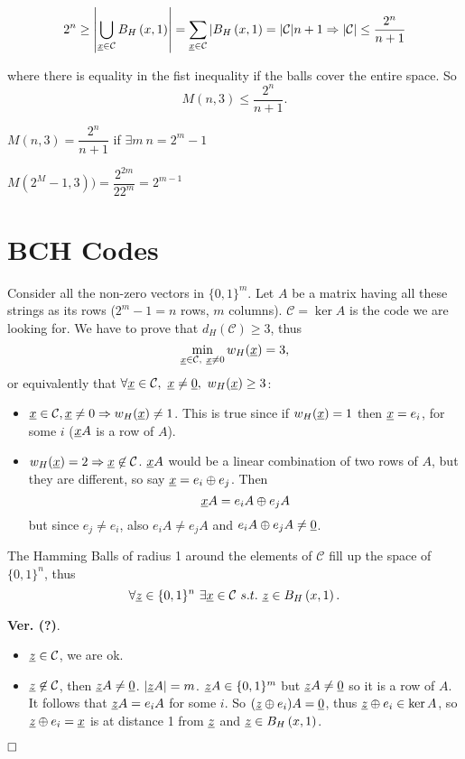 \[
2^n \geq \left|\bigcup_{\underline{x}\in \mathcal{C}}B_H\left(x, 1\right)\right| = \sum_{\underline{x} \in \mathcal{C}}|B_H\left(x, 1\right) = |\mathcal{C}|n + 1 \Rightarrow |\mathcal{C}| \leq \dfrac{2^n}{n+1}
\]

where there is equality in the fist inequality if the balls cover the entire space. So $$M(n, 3) \leq \dfrac{2^n}{n+1}.$$

\begin{thm}[Hamming]
	$M(n, 3) = \dfrac{2^n}{n+1}$ if $\exists m\ n = 2^m -1$	
\end{thm}

$M(2^M-1, 3) ) = \dfrac{2^{2m}}{22^m} = 2^{m-1}$

\section{BCH Codes}
Consider all the non-zero vectors in $\{0, 1\}^m$. Let $A$ be a matrix having all these strings as its rows ($2^m-1 = n$ rows, $m$ columns). $\mathcal{C} = \ker A$ is the code we are looking for. We have to prove that $d_H(\mathcal{C})\geq 3$, thus $$\min_{\str{x} \in \mathcal{C},\ \str{x} \not= 0} w_H(\str{x}) = 3,$$ or equivalently that $\forall \underline{x} \in \mathcal{C},\ \underline{x} \not= \underline{0},\ w_H(\underline{x}) \geq 3$:
\begin{itemize}
	\item $\underline{x} \in \mathcal{C}, \underline{x} \not=0 \Rightarrow w_H(\underline{x}) \not=1$. This is true since if $w_H(\underline{x})=1$ then $\underline{x} = e_i$, for some $i$ ($\underline{x}A$ is a row of $A$).
	\item $w_H(\underline{x}) = 2 \Rightarrow \underline{x} \not \in \mathcal{C}$. $\underline{x}A$ would be a linear combination of two rows of $A$, but they are different, so say $\underline{x} = e_i \oplus e_j$. Then $$\underline{x}A =  e_iA \oplus e_jA$$ but since $e_j \not= e_i$, also $ e_iA \not= e_jA$ and  $e_iA \oplus e_jA \not= \underline{0}$.
\end{itemize}

\begin{obs}
	The Hamming Balls of radius 1 around the elements of $\mathcal{C}$ fill up the space of $\{0, 1\}^n$, thus $$\forall \str{z} \in \{0, 1\}^n\ \exists \str{x} \in \mathcal{C}\ s.t.\ \str{z} \in \hball{x}{1}.$$
\end{obs}

\noindent\textbf{Ver. (?)}.
\begin{itemize}
	\item $\underline{z} \in \mathcal{C}$, we are ok. 
	\item $\underline{z} \not\in \mathcal{C}$, then $\underline{z}A \not= \underline{0}$. $|\underline{z}A| = m$. $\underline{z}A \in \{0, 1\}^m$ but $\underline{z}A \not= \underline{0}$ so it is a row of $A$. It follows that $\underline{z}A = e_iA$ for some $i$. So $(\underline{z} \oplus e_i)A = \underline{0}$, thus $\underline{z}\oplus e_i \in \ker A$, so $\underline{z}\oplus e_i = \underline{x}$ is at distance 1 from $\underline{z}$ and $\underline{z} \in B_H\left(x, 1\right)$.
\end{itemize}
$\hfill\Box$
